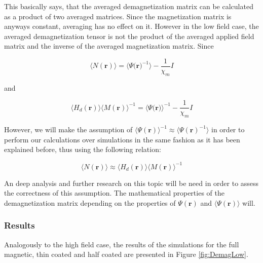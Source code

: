 This basically says, that the averaged demagnetization matrix can be calculated as a product of two averaged matrices. Since the magnetization matrix is anyways constant, averaging has no effect on it. However in the low field case, the averaged demagnetization tensor is not the product of the averaged applied field matrix and the inverse of the averaged magnetization matrix. Since

\begin{equation}
\langle N(\textbf{r}) \rangle = \langle \Psi({\textbf{r})}^{-1}\rangle - \frac{1}{\chi_m}I
\end{equation}

and

\begin{equation}
 \langle H_d(\textbf{r}) \rangle \langle M(\textbf{r}) \rangle ^{-1} = \langle \Psi({\textbf{r})}\rangle^{-1} - \frac{1}{\chi_m}I
\end{equation}

However, we will make the assumption of $\langle\Psi(\textbf{r})\rangle^{-1} \approx \langle\Psi(\textbf{r})^{-1}\rangle$ in order to perform our calculations over simulations in the same fashion as it has been explained before, thus using the following relation:

\begin{equation}
\langle N(\textbf{r}) \rangle \approx \langle H_d(\textbf{r}) \rangle \langle M(\textbf{r}) \rangle ^{-1}
\end{equation}

An deep analysis and further research on this topic will be need in order to assess the correctness of this assumption. The mathematical properties of the demagnetization matrix depending on the properties of $\Psi(\textbf{r})$ and $\langle\Psi(\textbf{r})\rangle$ will.

\subsubsection{Results}

Analogously to the high field case, the results of the simulations for the full magnetic, thin coated and half coated are presented in Figure \ref{fig:DemagLow}. 

